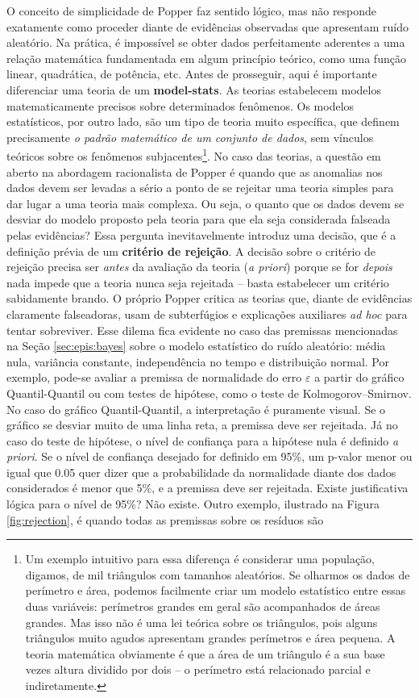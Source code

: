 \documentclass[./main.tex]{subfiles}
\begin{document}
\par O conceito de simplicidade de Popper faz sentido lógico, mas não responde exatamente como proceder diante de evidências observadas que apresentam ruído aleatório. Na prática, é impossível se obter dados perfeitamente aderentes a uma relação matemática fundamentada em algum princípio teórico, como uma função linear, quadrática, de potência, etc. Antes de prosseguir, aqui é importante diferenciar uma  teoria de um \textbf{\gls{model-stats}}. As teorias estabelecem modelos matematicamente precisos sobre determinados fenômenos. Os modelos estatísticos, por outro lado, são um tipo de teoria muito específica, que definem precisamente \textit{o padrão matemático de um conjunto de dados}, sem vínculos teóricos sobre os fenômenos subjacentes\footnote{Um exemplo intuitivo para essa diferença é considerar uma população, digamos, de mil triângulos com tamanhos aleatórios. Se olharmos os dados de perímetro e área, podemos facilmente criar um modelo estatístico entre essas duas variáveis: perímetros grandes em geral são acompanhados de áreas grandes. Mas isso não é uma lei teórica sobre os triângulos, pois alguns triângulos muito agudos apresentam grandes perímetros e área pequena. A teoria matemática obviamente é que a área de um triângulo é a sua base vezes altura dividido por dois -- o perímetro está relacionado parcial e indiretamente.}. No caso das teorias, a questão em aberto na abordagem racionalista de Popper é quando que as anomalias nos dados devem ser levadas a sério a ponto de se rejeitar uma teoria simples para dar lugar a uma teoria mais complexa. Ou seja, o quanto que os dados devem se desviar do modelo proposto pela teoria para que ela seja considerada falseada pelas evidências? Essa pergunta inevitavelmente introduz uma decisão, que é a definição prévia de um \textbf{critério de rejeição}. A decisão sobre o critério de rejeição precisa ser \textit{antes} da avaliação da teoria (\textit{a priori}) porque se for \textit{depois} nada impede que a teoria nunca seja rejeitada -- basta estabelecer um critério sabidamente brando. O próprio Popper critica as teorias que, diante de evidências claramente falseadoras, usam de subterfúgios e explicações auxiliares \textit{ad hoc} para tentar sobreviver. Esse dilema fica evidente no caso das premissas mencionadas na Seção \ref{sec:epis:bayes} sobre o modelo estatístico do ruído aleatório: média nula, variância constante, independência no tempo e distribuição normal. Por exemplo, pode-se avaliar a premissa de normalidade do erro $\varepsilon$ a partir do gráfico Quantil-Quantil ou com testes de hipótese, como o teste de Kolmogorov–Smirnov. No caso do gráfico Quantil-Quantil, a interpretação é puramente visual. Se o gráfico se desviar muito de uma linha reta, a premissa deve ser rejeitada. Já no caso do teste de hipótese, o nível de confiança para a hipótese nula é definido \textit{a priori}. Se o nível de confiança desejado for definido em 95\%, um p-valor menor ou igual que 0.05 quer dizer que a probabilidade da normalidade diante dos dados considerados é menor que 5\%, e a premissa deve ser rejeitada. Existe justificativa lógica para o nível de 95\%? Não existe. Outro exemplo, ilustrado na Figura \ref{fig:rejection}, é quando todas as premissas sobre os resíduos são 
\end{document}
